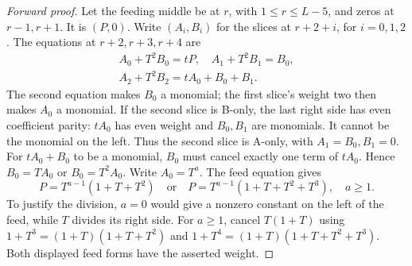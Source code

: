 \documentclass{article}
\begin{document}
\begin{proof}[Forward proof]
  Let the feeding middle be at \(r\), with \(1 \le r \le L-5\), and zeros at \(r - 1, r + 1\). It
  is \((P, 0)\). Write \((A_i, B_i)\) for the slices at \(r + 2 + i\), for \(i = 0, 1, 2\). The
  equations at \(r + 2, r + 3, r + 4\) are
  \begin{equation}\label{eq:cheap-forward}
    \begin{gathered}
      A_0 + T^2 B_0 = tP, \quad A_1 + T^2 B_1 = B_0, \\
      A_2 + T^2 B_2 = t A_0 + B_0 + B_1.
    \end{gathered}
  \end{equation}
  The second equation makes \(B_0\) a monomial; the first slice's weight two then makes \(A_0\) a
  monomial. If the second slice is B-only, the last right side has even coefficient parity:
  \(t A_0\) has even weight and \(B_0, B_1\) are monomials. It cannot be the monomial on the left.
  Thus the second slice is A-only, with \(A_1 = B_0, B_1 = 0\). For \(t A_0 + B_0\) to be a
  monomial, \(B_0\) must cancel exactly one term of \(t A_0\). Hence \(B_0 = T A_0\) or
  \(B_0 = T^2 A_0\). Write \(A_0 = T^a\). The feed equation gives
  \begin{equation}
    P = T^{a-1}(1 + T + T^2) \quad \text{or} \quad
    P = T^{a-1}(1 + T + T^2 + T^3), \quad a \ge 1.
  \end{equation}
  To justify the division, \(a = 0\) would give a nonzero constant on the left of the feed, while
  \(T\) divides its right side. For \(a \ge 1\), cancel \(T(1 + T)\) using
  \(1 + T^3 = (1 + T)(1 + T + T^2)\) and \(1 + T^4 = (1 + T)(1 + T + T^2 + T^3)\). Both displayed
  feed forms have the asserted weight.
\end{proof}
\end{document}

